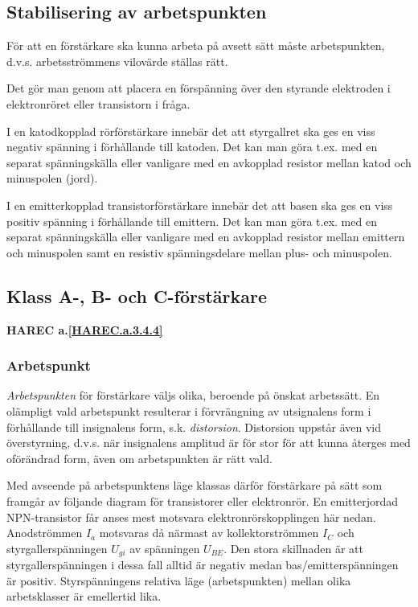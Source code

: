 

\subsection{Stabilisering av arbetspunkten}

För att en förstärkare ska kunna arbeta på avsett sätt måste
arbetspunkten, d.v.s. arbetsströmmens vilovärde ställas rätt.

Det gör man genom att placera en förspänning över den styrande
elektroden i elektronröret eller transistorn i fråga.

I en katodkopplad rörförstärkare innebär det att styrgallret ska
ges en viss negativ spänning i förhållande till katoden. Det kan man
göra t.ex. med en separat spänningskälla eller vanligare med en
avkopplad resistor mellan katod och minuspolen (jord).

I en emitterkopplad transistorförstärkare innebär det att basen ska
ges en viss positiv spänning i förhållande till emittern. Det kan man
göra t.ex. med en separat spänningskälla eller vanligare med en
avkopplad resistor mellan emittern och minuspolen samt en resistiv
spänningsdelare mellan plus- och minuspolen.

\subsection{Klass A-, B- och C-förstärkare}
\textbf{HAREC a.\ref{HAREC.a.3.4.4}\label{myHAREC.a.3.4.4}}

\subsubsection{Arbetspunkt}

\emph{Arbetspunkten} för förstärkare väljs olika, beroende på önskat
arbetssätt. En olämpligt vald arbetspunkt resulterar i förvrängning av
utsignalens form i förhållande till insignalens form,
s.k. \emph{distorsion}. Distorsion uppstår även vid överstyrning,
d.v.s. när insignalens amplitud är för stor för att kunna återges med
oförändrad form, även om arbetspunkten är rätt vald.

Med avseende på arbetspunktens läge klassas därför förstärkare på sätt
som framgår av följande diagram för transistorer eller elektronrör.
En emitterjordad NPN-transistor får anses mest motsvara
elektronrörskopplingen här nedan.
Anodströmmen \(I_a\) motsvaras då närmast av kollektorströmmen
\(I_C\) och styrgallerspänningen \(U_{gi}\) av spänningen
\(U_{BE}\).
Den stora skillnaden är att styrgallerspänningen i dessa
fall alltid är negativ medan bas/emitterspänningen är positiv.
Styrspänningens relativa läge (arbetspunkten) mellan olika
arbetsklasser är emellertid lika.

